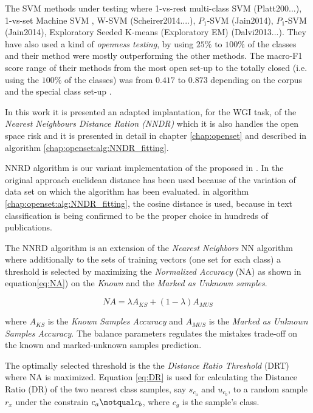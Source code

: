 The SVM methods under testing where 1-vs-rest multi-class SVM (Platt200...), 1-vs-set Machine SVM \cite{scheirer2013toward}, W-SVM (Scheirer2014....), $P_{1}$-SVM (Jain2014), $P_{1}$-SVM (Jain2014), Exploratory Seeded K-means (Exploratory EM) (Dalvi2013...). They have also used a kind of \textit{openness testing}, by using $25\%$ to $100\%$ of the classes and their method were mostly outperforming the other methods. The macro-F1 score range of their methods from the most open set-up to the totally closed (i.e. using the $100\%$ of the classes) was from $0.417$ to $0.873$ depending on the corpus and the special class set-up \parencite{fei2016breaking}.

In this work it is presented an adapted implantation, for the WGI task, of the \textit{Nearest Neighbours Distance Ration (NNDR)} which it is also handles the open space risk and it is presented in detail in chapter \ref{chap:openset} and described in algorithm \ref{chap:openset:alg:NNDR_fitting}.

NNRD algorithm is our variant implementation of the proposed in \cite{mendesjunior2016}. In the original approach euclidean distance has been used because of the variation of data set on which the algorithm has been evaluated. in algorithm \ref{chap:openset:alg:NNDR_fitting}, the cosine distance is used, because in text classification is being confirmed to be the proper choice in hundreds of publications. 

The NNRD algorithm is an extension of the \textit{Nearest Neighbors} NN algorithm where additionally to the sets of training vectors (one set for each class) a threshold is selected by maximizing the \textit{Normalized Accuracy} (NA) as shown in equation\ref{eq:NA}) on the \textit{Known} and the \textit{Marked as Unknown samples}.

\begin{equation} \label{eq:NA}
    NA = \lambda A_{KS} + (1 - \lambda) A_{MUS}
\end{equation}

\noindent
where $A_{KS}$ is the \textit{Known Samples Accuracy} and $A_{MUS}$ is the \textit{Marked as Unknown Samples Accuracy}. The balance parameters \lambda regulates the mistakes trade-off on the known and marked-unknown samples prediction.

The optimally selected threshold is the the \textit{Distance Ratio Threshold} (DRT) where NA is maximized. Equation \ref{eq:DR} is used for calculating the Distance Ratio (DR) of the two nearest class samples, say $s_{c_{a}}$ and $u_{c_{b}}$, to a random sample $r_{x}$ under the constrain $c_{a} \notqual c_{b}$, where $c_{g}$ is the sample's class.

